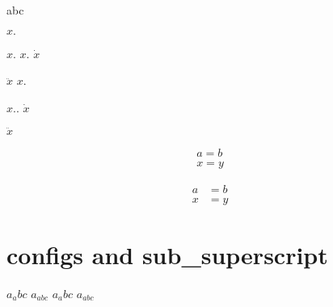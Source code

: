abc

$x.$

$x.$
$x.$
$\dot{x}$

$\ddot{x}$
$x.$

$x..$
$\dot{x}$

$\ddot{x}$

\begin {align}
a = b \\
x = y
\end{align}

\begin {align}
a &= b \\
x &= y
\end{align}

\section{configs and sub_superscript}
$a_ abc $
$a_ {abc} $
$a_abc$
$a_{abc}$

